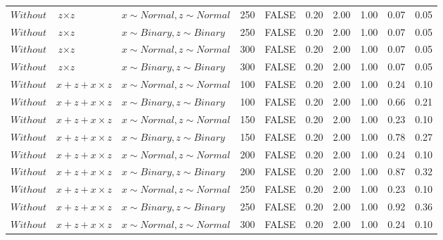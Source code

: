 \begin{longtable}{lllrlrrrrr}
  $Without$ & $\textit{z} \times \textit{z}$ & $\textit{x} \sim Normal , \textit{z} \sim Normal$ & 250 & FALSE & 0.20 & 2.00 & 1.00 & 0.07 & 0.05 \\ 
  $Without$ & $\textit{z} \times \textit{z}$ & $\textit{x} \sim Binary, \textit{z} \sim Binary$ & 250 & FALSE & 0.20 & 2.00 & 1.00 & 0.07 & 0.05 \\ 
  $Without$ & $\textit{z} \times \textit{z}$ & $\textit{x} \sim Normal , \textit{z} \sim Normal$ & 300 & FALSE & 0.20 & 2.00 & 1.00 & 0.07 & 0.05 \\ 
  $Without$ & $\textit{z} \times \textit{z}$ & $\textit{x} \sim Binary, \textit{z} \sim Binary$ & 300 & FALSE & 0.20 & 2.00 & 1.00 & 0.07 & 0.05 \\ 
  $Without$ & $\textit{x} + \textit{z} + \textit{x} \times \textit{z}$ & $\textit{x} \sim Normal , \textit{z} \sim Normal$ & 100 & FALSE & 0.20 & 2.00 & 1.00 & 0.24 & 0.10 \\ 
  $Without$ & $\textit{x} + \textit{z} + \textit{x} \times \textit{z}$ & $\textit{x} \sim Binary, \textit{z} \sim Binary$ & 100 & FALSE & 0.20 & 2.00 & 1.00 & 0.66 & 0.21 \\ 
  $Without$ & $\textit{x} + \textit{z} + \textit{x} \times \textit{z}$ & $\textit{x} \sim Normal , \textit{z} \sim Normal$ & 150 & FALSE & 0.20 & 2.00 & 1.00 & 0.23 & 0.10 \\ 
  $Without$ & $\textit{x} + \textit{z} + \textit{x} \times \textit{z}$ & $\textit{x} \sim Binary, \textit{z} \sim Binary$ & 150 & FALSE & 0.20 & 2.00 & 1.00 & 0.78 & 0.27 \\ 
  $Without$ & $\textit{x} + \textit{z} + \textit{x} \times \textit{z}$ & $\textit{x} \sim Normal , \textit{z} \sim Normal$ & 200 & FALSE & 0.20 & 2.00 & 1.00 & 0.24 & 0.10 \\ 
  $Without$ & $\textit{x} + \textit{z} + \textit{x} \times \textit{z}$ & $\textit{x} \sim Binary, \textit{z} \sim Binary$ & 200 & FALSE & 0.20 & 2.00 & 1.00 & 0.87 & 0.32 \\ 
  $Without$ & $\textit{x} + \textit{z} + \textit{x} \times \textit{z}$ & $\textit{x} \sim Normal , \textit{z} \sim Normal$ & 250 & FALSE & 0.20 & 2.00 & 1.00 & 0.23 & 0.10 \\ 
  $Without$ & $\textit{x} + \textit{z} + \textit{x} \times \textit{z}$ & $\textit{x} \sim Binary, \textit{z} \sim Binary$ & 250 & FALSE & 0.20 & 2.00 & 1.00 & 0.92 & 0.36 \\ 
  $Without$ & $\textit{x} + \textit{z} + \textit{x} \times \textit{z}$ & $\textit{x} \sim Normal , \textit{z} \sim Normal$ & 300 & FALSE & 0.20 & 2.00 & 1.00 & 0.24 & 0.10 \\ 

\end{longtable}
